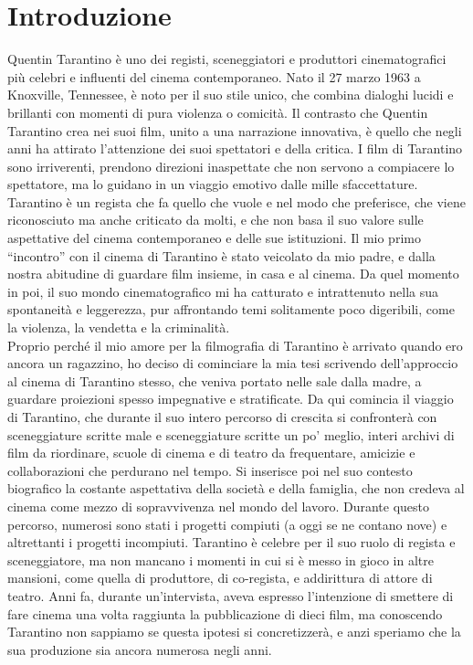 \documentclass[12pt]{article} %
\begin{document}
\section{Introduzione}
\begin{flushleft}
    Quentin Tarantino è uno dei registi, sceneggiatori e produttori cinematografici più celebri e influenti del cinema contemporaneo. Nato il 27 marzo 1963 a Knoxville, Tennessee, è noto per il suo stile unico, che combina dialoghi lucidi e brillanti con momenti di pura violenza o comicità. Il contrasto che Quentin Tarantino crea nei suoi film, unito a una narrazione innovativa, è quello che negli anni ha attirato l’attenzione dei suoi spettatori e della critica. I film di Tarantino sono irriverenti, prendono direzioni inaspettate che non servono a compiacere lo spettatore, ma lo guidano in un viaggio emotivo dalle mille sfaccettature.
    Tarantino è un regista che fa quello che vuole e nel modo che preferisce, che viene riconosciuto ma anche criticato da molti, e che non basa il suo valore sulle aspettative del cinema contemporaneo e delle sue istituzioni.
    Il mio primo ``incontro” con il cinema di Tarantino è stato veicolato da mio padre, e dalla nostra abitudine di guardare film insieme, in casa e al cinema. Da quel momento in poi, il suo mondo cinematografico mi ha catturato e intrattenuto nella sua spontaneità e leggerezza, pur affrontando temi solitamente poco digeribili, come la violenza, la vendetta e la criminalità.
    \\\vspace{1cm}
    Proprio perché il mio amore per la filmografia di Tarantino è arrivato quando ero ancora un ragazzino, ho deciso di cominciare la mia tesi scrivendo dell’approccio al cinema di Tarantino stesso, che veniva portato nelle sale dalla madre, a guardare proiezioni spesso impegnative e stratificate.
    Da qui comincia il viaggio di Tarantino, che durante il suo intero percorso di crescita si confronterà con sceneggiature scritte male e sceneggiature scritte un po’ meglio, interi archivi di film da riordinare, scuole di cinema e di teatro da frequentare, amicizie e collaborazioni che perdurano nel tempo. Si inserisce poi nel suo contesto biografico la costante aspettativa della società e della famiglia, che non credeva al cinema come mezzo di sopravvivenza nel mondo del lavoro.
    Durante questo percorso, numerosi sono stati i progetti compiuti (a oggi se ne contano nove) e altrettanti i progetti incompiuti. Tarantino è celebre per il suo ruolo di regista e sceneggiatore, ma non mancano i momenti in cui si è messo in gioco in altre mansioni, come quella di produttore, di co-regista, e addirittura di attore di teatro. Anni fa, durante un’intervista, aveva espresso l’intenzione di smettere di fare cinema una volta raggiunta la pubblicazione di dieci film, ma conoscendo Tarantino non sappiamo se questa ipotesi si concretizzerà, e anzi speriamo che la sua produzione sia ancora numerosa negli anni.

\end{flushleft}
\end{document}
